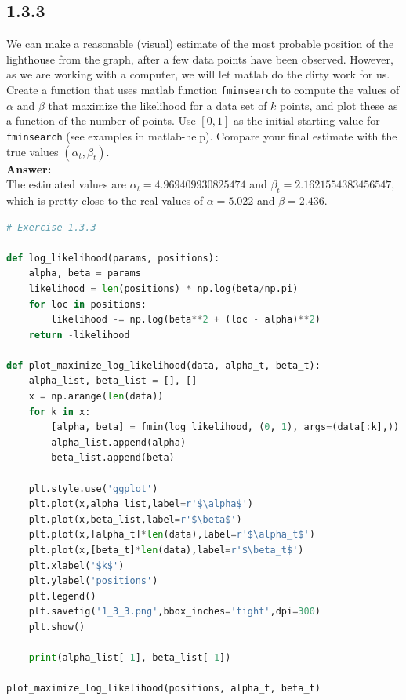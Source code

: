 \documentclass[a4paper]{article}
\begin{document}
\subsection*{1.3.3}

We can make a reasonable (visual) estimate of the most probable position of the lighthouse from the graph, after a few data points have been observed. However, as we are working with a computer, we will let matlab do the dirty work for us.\\

Create a function that uses matlab function \texttt{fminsearch} to compute the values of $\alpha$ and $\beta$ that maximize the likelihood for a data set of $k$ points, and plot these as a function of the number of points. Use $[0, 1]$ as the initial starting value for \texttt{ fminsearch} (see examples in matlab-help). Compare your final estimate with the true values $(\alpha_t,\beta_t)$.\\

\textbf{Answer:}\\

The estimated values are $\alpha_t = 4.969409930825474$ and $\beta_t =  2.1621554383456547$, which is pretty close to the real values of $\alpha = 5.022$ and $\beta = 2.436$.\\




\begin{lstlisting}[language=Python]
# Exercise 1.3.3

def log_likelihood(params, positions):
    alpha, beta = params
    likelihood = len(positions) * np.log(beta/np.pi)
    for loc in positions:
        likelihood -= np.log(beta**2 + (loc - alpha)**2)
    return -likelihood
    
def plot_maximize_log_likelihood(data, alpha_t, beta_t):
    alpha_list, beta_list = [], []
    x = np.arange(len(data))
    for k in x:
        [alpha, beta] = fmin(log_likelihood, (0, 1), args=(data[:k],))
        alpha_list.append(alpha)
        beta_list.append(beta)
    
    plt.style.use('ggplot')
    plt.plot(x,alpha_list,label=r'$\alpha$')
    plt.plot(x,beta_list,label=r'$\beta$')
    plt.plot(x,[alpha_t]*len(data),label=r'$\alpha_t$')
    plt.plot(x,[beta_t]*len(data),label=r'$\beta_t$')
    plt.xlabel('$k$')
    plt.ylabel('positions')
    plt.legend()
    plt.savefig('1_3_3.png',bbox_inches='tight',dpi=300)
    plt.show()

    print(alpha_list[-1], beta_list[-1])
    
plot_maximize_log_likelihood(positions, alpha_t, beta_t)    
\end{lstlisting}
\end{document}
